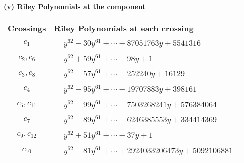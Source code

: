\documentclass[1p]{elsarticle_modified}
\theoremstyle{definition}
\begin{document}
\newpage\renewcommand{\arraystretch}{1}
\flushleft \textbf{(v) Riley Polynomials at the component}\newline \\
\begin{tabular}{m{50pt}|m{274pt}}
Crossings & \hspace{64pt}Riley Polynomials at each crossing \\
\hline $$\begin{aligned}c_{1}\end{aligned}$$&$\begin{aligned}
&y^{62}-30 y^{61}+\cdots+87051763 y+5541316
\end{aligned}$\\
\hline $$\begin{aligned}c_{2},c_{6}\end{aligned}$$&$\begin{aligned}
&y^{62}+59 y^{61}+\cdots-98 y+1
\end{aligned}$\\
\hline $$\begin{aligned}c_{3},c_{8}\end{aligned}$$&$\begin{aligned}
&y^{62}-57 y^{61}+\cdots-252240 y+16129
\end{aligned}$\\
\hline $$\begin{aligned}c_{4}\end{aligned}$$&$\begin{aligned}
&y^{62}-95 y^{61}+\cdots-19707883 y+398161
\end{aligned}$\\
\hline $$\begin{aligned}c_{5},c_{11}\end{aligned}$$&$\begin{aligned}
&y^{62}-99 y^{61}+\cdots-7503268241 y+576384064
\end{aligned}$\\
\hline $$\begin{aligned}c_{7}\end{aligned}$$&$\begin{aligned}
&y^{62}-89 y^{61}+\cdots-6246385553 y+334414369
\end{aligned}$\\
\hline $$\begin{aligned}c_{9},c_{12}\end{aligned}$$&$\begin{aligned}
&y^{62}+51 y^{61}+\cdots-37 y+1
\end{aligned}$\\
\hline $$\begin{aligned}c_{10}\end{aligned}$$&$\begin{aligned}
&y^{62}-81 y^{61}+\cdots+2924033206473 y+5092106881
\end{aligned}$\\
\hline
\end{tabular}\\~\\
\end{document}
